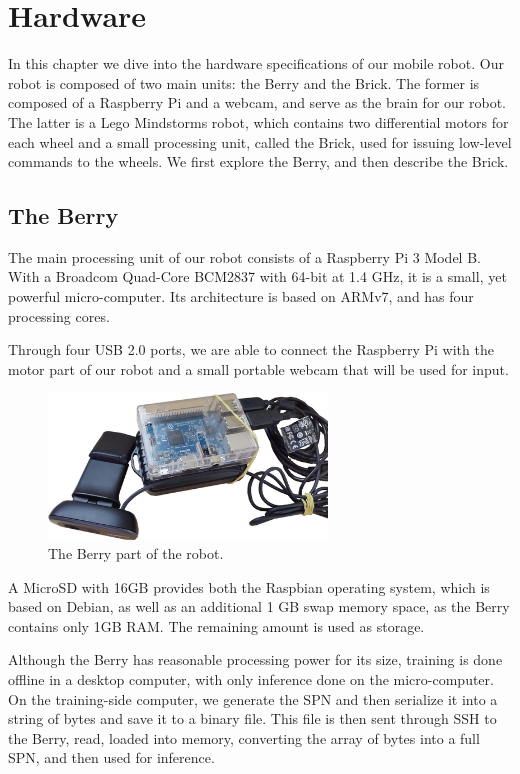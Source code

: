 
\chapter{Hardware}\label{chp:hardware}

In this chapter we dive into the hardware specifications of our mobile robot. Our robot is composed
of two main units: the Berry and the Brick. The former is composed of a Raspberry Pi and a webcam,
and serve as the brain for our robot. The latter is a Lego Mindstorms robot, which contains two
differential motors for each wheel and a small processing unit, called the Brick, used for issuing
low-level commands to the wheels. We first explore the Berry, and then describe the Brick.

\section{The Berry}

The main processing unit of our robot consists of a Raspberry Pi 3 Model B. With a Broadcom
Quad-Core BCM2837 with 64-bit at 1.4 GHz, it is a small, yet powerful micro-computer. Its
architecture is based on ARMv7, and has four processing cores.

Through four USB 2.0 ports, we are able to connect the Raspberry Pi with the motor part of our
robot and a small portable webcam that will be used for input.

\begin{figure}[h]
  \centering\includegraphics[width=0.66\textwidth]{imgs/berry.png}
  \caption{The Berry part of the robot.}
\end{figure}

A MicroSD with 16GB provides both the Raspbian operating system, which is based on Debian, as well
as an additional 1 GB swap memory space, as the Berry contains only 1GB RAM. The remaining amount
is used as storage.

Although the Berry has reasonable processing power for its size, training is done offline in a
desktop computer, with only inference done on the micro-computer. On the training-side computer, we
generate the SPN and then serialize it into a string of bytes and save it to a binary file. This
file is then sent through SSH to the Berry, read, loaded into memory, converting the array of bytes
into a full SPN, and then used for inference.

